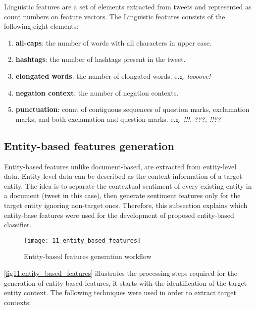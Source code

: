 Linguistic features are a set of elements extracted from tweets and represented as count numbers on feature vectors.  The Linguistic features consists of the following eight
elements:

\begin{enumerate}
\itemsep0em 

\item \textbf{all-caps}: the number of words with all characters in upper case.

\item \textbf{hashtags}: the number of hashtags present in the tweet.

\item \textbf{elongated words}: the number of elongated words. e.g. \textit{loooove!}

\item \textbf{negation context}: the number of negation contexts.

\item \textbf{punctuation}: count of contiguous sequences of question marks, exclamation marks, and both exclamation and question marks. e.g. \textit{!!!, ???, !!??}

\end{enumerate}

\subsection{Entity-based features generation}
\label{sec:feature_generation}

Entity-based features unlike document-based, are extracted from entity-level data. Entity-level data can be described as the context information of a target entity. The idea is to separate the contextual sentiment of every existing entity in a document (tweet in this case), then generate sentiment features only for the target entity ignoring non-target ones. Therefore, this subsection explains which entity-base features were used for the development of proposed entity-based classifier. 

\begin{figure}[H]
    \centering
    \caption{Entity-based features generation workflow}
    \texttt{[image: 11\_entity\_based\_features]}
    \label{fig11:entity_based_features}
\end{figure}

\autoref{fig11:entity_based_features} illustrates the processing steps required for the generation of entity-based features, it starts with the identification of the target entity context. The following techniques were used in order to extract target contexts:


